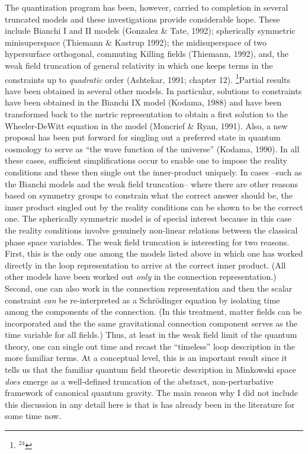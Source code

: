 The quantization program has been, however, carried to completion in several
truncated models and these investigations provide considerable hope.
These include
Bianchi I and II models (Gonzalez \& Tate, 1992); spherically
symmetric minisuperspace (Thiemann \& Kastrup 1992); the midisuperspace
of two hypersurface orthogonal, commuting Killing fields (Thiemann, 1992),
and, the weak field truncation of general relativity in which one keeps
terms in the constraints up to {\it quadratic} order (Ashtekar, 1991;
chapter 12).%
\footnote{$^{24}$}{Partial results have been obtained in several other models.
In particular, solutions to constraints have been obtained in the Bianchi
IX model (Kodama, 1988) and have been transformed back to the metric
representation to obtain a first solution to the Wheeler-DeWitt equation
in the model (Moncrief \& Ryan, 1991). Also, a new proposal has been
put forward for singling out a preferred state in quantum cosmology to
serve as ``the wave function of the universe'' (Kodama, 1990).}
In
all these cases, sufficient simplifications occur to enable one to impose
the reality conditions and these then single out the inner-product
uniquely. In cases --such as the Bianchi models and the weak field
truncation-- where there are other reasons based on symmetry groups to
constrain what the correct answer should be, the inner product singled
out by the reality conditions can be shown to be the correct one. The
spherically symmetric model is of special interest because in this case
the reality conditions involve genuinely non-linear relations between the
classical phase space variables. The weak field truncation is interesting
for two reasons. First, this is the only one among the models listed above
in which one has worked directly in the loop representation to arrive at
the correct inner product. (All other models have been worked out {\it only}
in the connection representation.) Second, one can also work in the connection
representation and then the scalar constraint {\it can} be re-interpreted
as a Schr\"odinger equation by isolating time among the components of the
connection. (In this treatment, matter fields can be incorporated and the
the same gravitational connection component serves as the time variable for
all fields.) Thus, at least in the weak field limit of the quantum theory,
one can single out time and recast the ``timeless'' loop description in
the more familiar terms. At a conceptual level, this is an important result
since it tells us that the familiar quantum field theoretic description in
Minkowski space {\it does} emerge as a well-defined truncation of the abstract,
non-perturbative framework of canonical quantum gravity. The main reason why
I did not include this discussion in any detail here is that is has already
been in the literature for some time now.

